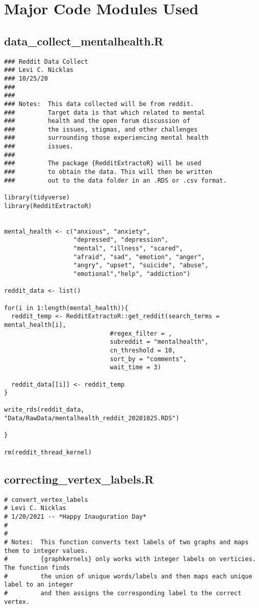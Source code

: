 \begin{appendices}
\begin{lstlisting}
\end{lstlisting}

\chapter{Major Code Modules Used}


\section{data\_collect\_mentalhealth.R}
\begin{lstlisting}
### Reddit Data Collect
### Levi C. Nicklas
### 10/25/20
###
###
### Notes:  This data collected will be from reddit. 
###         Target data is that which related to mental
###         health and the open forum discussion of 
###         the issues, stigmas, and other challenges
###         surrounding those experiencing mental health
###         issues.
###
###         The package {RedditExtractoR} will be used 
###         to obtain the data. This will then be written
###         out to the data folder in an .RDS or .csv format.

library(tidyverse)
library(RedditExtractoR)


mental_health <- c("anxious", "anxiety", 
                   "depressed", "depression",
                   "mental", "illness", "scared",
                   "afraid", "sad", "emotion", "anger",
                   "angry", "upset", "suicide", "abuse",
                   "emotional","help", "addiction")

reddit_data <- list()

for(i in 1:length(mental_health)){
  reddit_temp <- RedditExtractoR::get_reddit(search_terms = mental_health[i], 
                             #regex_filter = ,
                             subreddit = "mentalhealth",
                             cn_threshold = 10,
                             sort_by = "comments",
                             wait_time = 3)
  
  reddit_data[[i]] <- reddit_temp
}

write_rds(reddit_data, "Data/RawData/mentalhealth_reddit_20201025.RDS")

}

rm(reddit_thread_kernel)
\end{lstlisting}

\section{correcting\_vertex\_labels.R}
\begin{lstlisting}
# convert_vertex_labels
# Levi C. Nicklas
# 1/20/2021 -- *Happy Inauguration Day*
#
#
# Notes:  This function converts text labels of two graphs and maps them to integer values.
#         {graphkernels} only works with integer labels on verticies. The function finds 
#         the union of unique words/labels and then maps each unique label to an integer
#         and then assigns the corresponding label to the correct vertex.


\end{lstlisting}
\end{appendices}
